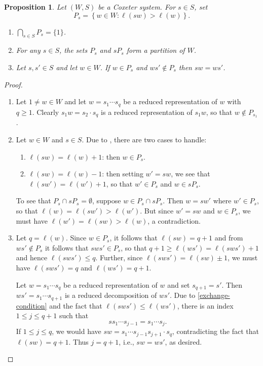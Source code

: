 \documentclass{article}
\theoremstyle{thmstyle}
\newtheorem{proposition}[theorem]{Proposition}
\theoremstyle{defstyle}
\renewcommand{\le}{\leqslant}
\renewcommand{\ge}{\geqslant}
\begin{document}
\begin{proposition}
    Let $(W, S)$ be a Coxeter system. For $s\in S$, set 
    \begin{equation*}
        P_s = \left\{w\in W\colon \ell(sw) > \ell(w)\right\}.
    \end{equation*}
    \begin{enumerate}[label=(\Roman*)]
        \item $\displaystyle\bigcap_{s\in S} P_s = \{1\}$.
        \item For any $s\in S$, the sets $P_s$ and $sP_s$ form a partition of $W$. 
        \item Let $s, s'\in S$ and let $w\in W$. If $w\in P_s$ and $ws'\notin P_s$ then $sw = ws'$. \label{condition-for-next-proposition}
    \end{enumerate}
\end{proposition}
\begin{proof}
\begin{enumerate}[label=(\Roman*)]
    \item Let $1\ne w\in W$ and let $w = s_1\cdots s_q$ be a reduced representation of $w$ with $q\ge 1$. Clearly $s_1w = s_2\cdot s_q$ is a reduced representation of $s_1w$, so that $w\notin P_{s_1}$. 
    
    \item Let $w\in W$ and $s\in S$. Due to , there are two cases to handle: 
    \begin{enumerate}[label=(\roman*)]
        \item $\ell(sw) = \ell(w) + 1$: then $w\in P_s$. 
        \item $\ell(sw) = \ell(w) - 1$: then setting $w' = sw$, we see that $\ell(sw') = \ell(w') + 1$, so that $w'\in P_s$ and $w\in sP_s$.
    \end{enumerate}
    To see that $P_s\cap sP_s = \emptyset$, suppose $w\in P_s\cap sP_s$. Then $w = sw'$ where $w'\in P_s$, so that $\ell(w) = \ell(sw') > \ell(w')$. But since $w' = sw$ and $w\in P_s$, we must have $\ell(w') = \ell(sw) > \ell(w)$, a contradiction.

    \item Let $q = \ell(w)$. Since $w\in P_s$, it follows that $\ell(sw) = q + 1$ and from $ws'\notin P_s$ it follows that $sws'\in P_s$, so that $q + 1\ge\ell(ws') = \ell(sws') + 1$ and hence $\ell(sws')\le q$. Further, since $\ell(sws') = \ell(sw) \pm 1$, we must have $\ell(sws') = q$ and $\ell(ws') = q + 1$.

    Let $w = s_1\cdots s_q$ be a reduced representation of $w$ and set $s_{q + 1} = s'$. Then $ws' = s_1\cdots s_{q + 1}$ is a reduced decomposition of $ws'$. Due to \ref{exchange-condition} and the fact that $\ell(sws')\le\ell(ws')$, there is an index $1\le j\le q + 1$ such that 
    \begin{equation*}
        ss_1\cdots s_{j - 1} = s_1\cdots s_j.
    \end{equation*}
    If $1\le j\le q$, we would have $sw = s_1\cdots s_{j - 1}s_{j + 1}\cdot s_q$, contradicting the fact that $\ell(sw) = q + 1$. Thus $j = q + 1$, i.e., $sw = ws'$, as desired. \qedhere
\end{enumerate}
\end{proof}
\end{document}
